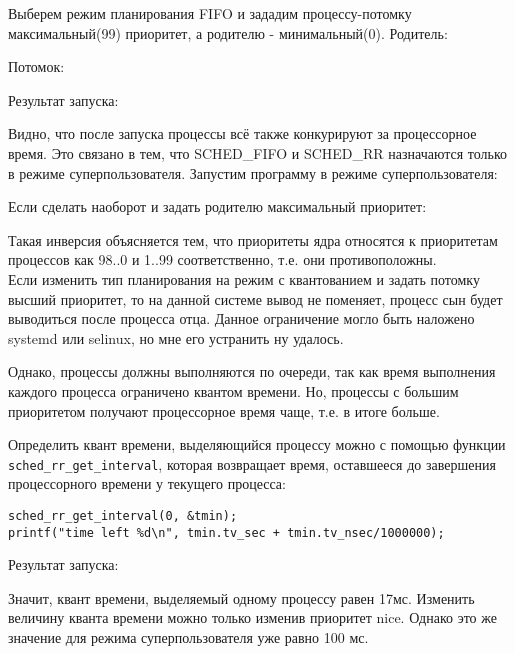\documentclass[a4paper]{article}
\begin{document}
	
	Выберем режим планирования FIFO и зададим процессу-потомку максимальный(99) приоритет, а родителю - минимальный(0).
	Родитель:
	

	Потомок:
	

	
	Результат запуска:
	
		
	Видно, что после запуска процессы всё также конкурируют за процессорное время. Это связано в тем, что  SCHED\_FIFO и SCHED\_RR назначаются только в режиме суперпользователя. Запустим программу в режиме суперпользователя:
	
	
	Если сделать наоборот и задать родителю максимальный приоритет:
	
	Такая инверсия объясняется тем, что приоритеты ядра относятся к приоритетам процессов как 98..0 и 1..99 соответственно, т.е. они противоположны.\\

	
	Если изменить тип планирования на режим с квантованием и задать потомку высший приоритет, то на данной системе вывод не поменяет, процесс сын будет выводиться после процесса отца. Данное ограничение могло быть наложено systemd или selinux,	но мне его устранить ну удалось.
	
	Однако, процессы должны выполняются по очереди, так как время выполнения каждого процесса ограничено квантом времени. Но, процессы с большим приоритетом получают процессорное время чаще, т.е. в итоге больше.
	
	Определить квант времени, выделяющийся процессу можно с помощью функции \\\texttt{sched\_rr\_get\_interval}, которая возвращает время, оставшееся до завершения процессорного времени у текущего процесса:
	
	\begin{lstlisting}[style=crs_cpp]	
sched_rr_get_interval(0, &tmin);
printf("time left %d\n", tmin.tv_sec + tmin.tv_nsec/1000000);
	\end{lstlisting}
	
	Результат запуска:
	
	
	Значит, квант времени, выделяемый одному процессу равен 17мс. Изменить величину кванта времени можно только изменив приоритет nice.
	Однако это же значение для режима суперпользователя уже равно 100 мс.
\end{document}
